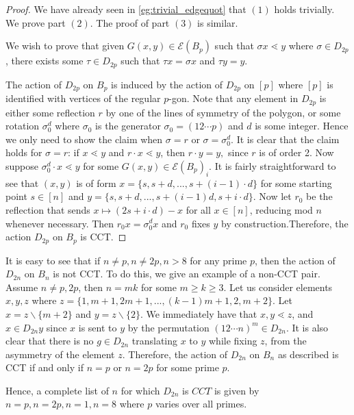 \documentclass[smallextended, envcountsame, numbook]{svjour3}
\numberwithin{equation}{section}
\begin{document}
\building*

\begin{proof}
We have already seen in \ref{eg:trivial_edgequot} that $(1)$ holds trivially. We prove part $(2)$. The proof of part $(3)$ is similar. 

We wish to prove that given $G(x, y) \in \mathcal E (B_p)$ such that $\sigma x \lessdot y$ where $\sigma \in D_{2p}$, there exists some $\tau \in D_{2p}$ such that $\tau x = \sigma x$ and $\tau y = y$. 

The action of $D_{2p}$ on $B_p$ is induced by the action of $D_{2p}$ on $[p]$ where $[p]$ is identified with vertices of the regular $p$-gon. Note that any element in $D_{2p}$ is either some reflection $r$ by one of the lines of symmetry of the polygon, or some rotation $\sigma_0^{d} $ where $\sigma_0$ is the generator $\sigma_0 = (12 \cdots p)$ and $d$ is some integer. Hence we only need to show the claim when $\sigma = r$ or $\sigma = \sigma_0^d$. It is clear that the claim holds for $\sigma = r$: if $x \lessdot y$ and $r \cdot x \lessdot y$, then $r \cdot y = y,$ since $r$ is of order 2. Now suppose $\sigma_0^d \cdot x \lessdot y$ for some $G(x,y) \in \mathcal E(B_p)_i$.  It is fairly straightforward to see that $(x, y)$ is of form $x = \{s, s+d, ..., s+(i-1)\cdot d\}$ for some starting point $s \in [n]$ and $y = \{s, s+d, ..., s+(i-1)d, s + i \cdot d\}$. Now let $r_0$ be the reflection that sends $x \mapsto (2s+ i \cdot d)-x$ for all $x \in [n]$, reducing mod $n$ whenever necessary. Then $r_0 x = \sigma_0^d x$ and $r_0$ fixes $y$ by construction.Therefore, the action $D_{2p}$ on $B_p$ is CCT. 
\end{proof}


\begin{remark}
\label{prop:iff_dihedral_cct}
It is easy to see that if $n \neq p,n \neq 2p, n >8$ for any prime $p$, then the action of $D_{2n}$ on $B_n$ is not CCT. To do this, we give an example of a non-CCT pair. Assume $n \ne p, 2 p$, then $n = mk$ for some $m \ge k \ge 3$. Let us consider elements $x, y, z$ where $z = \{1, m+1, 2m+1, ..., (k-1)m+1, 2, m+2\}$. Let $x = z \backslash \{m+2\}$ and $y = z \backslash \{2\}$. We immediately have that $x, y \lessdot z$, and $x \in D_{2n} y$ since $x$ is sent to $y$ by the permutation $(12\cdots n)^m \in D_{2n}$. It is also clear that there is no $g \in D_{2n}$ translating $x$ to $y$ while fixing $z$, from the asymmetry of the element $z$. Therefore, the action of $D_{2n}$ on $B_n$ as described is CCT if and only if $n =p$ or $n = 2p$ for some prime $p$.

Hence, a complete list of $n$ for which $D_{2n}$ is $CCT$ is given by $n = p,n = 2p, n = 1, n = 8$ where $p$ varies over all primes.
\end{remark}
\end{document}
